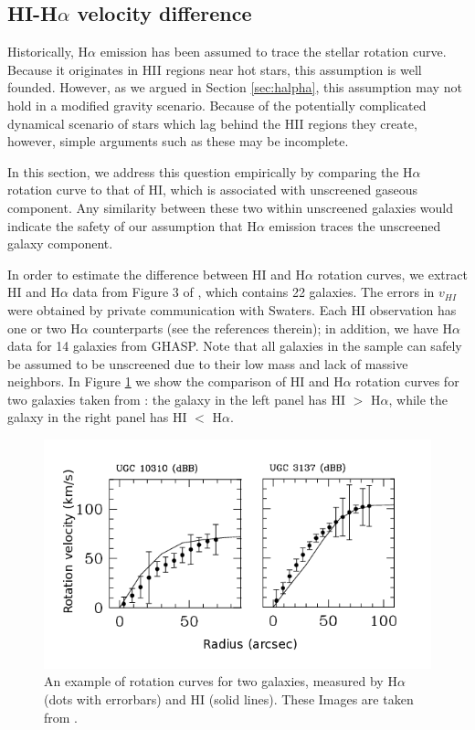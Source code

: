 \documentclass[useAMS,usenatbib,twocolumn]{mn2e}
\newcommand{\ha}{H$\alpha$}
\begin{document}
\subsection{HI-\ha{} velocity difference}
\label{sec:hihalpha}

Historically, \ha{} emission has been assumed to trace the stellar rotation
curve.  Because it originates in HII regions near hot stars, this assumption
is well founded.  However, as we argued in Section \ref{sec:halpha}, this
assumption may not hold in a modified gravity scenario.  Because of the
potentially complicated dynamical scenario of stars which lag behind the HII
regions they create, however, simple arguments such as these may be incomplete.

In this section, we address this question empirically
by comparing the \ha{} rotation curve to that of HI, which is
associated with unscreened gaseous component. Any similarity between
these two within unscreened galaxies would indicate the safety of our
assumption that \ha{} emission traces the unscreened galaxy component.

In order to estimate the difference between HI and \ha{} rotation
curves, we extract HI and \ha{} data from Figure 3 of \citet{Swaters2009}, which
contains 22 galaxies. The errors in $v_{HI}$ were obtained by private
communication with Swaters.  Each HI observation has one or two \ha{}
counterparts (see the references therein); in addition, we have \ha{} data for
14 galaxies from GHASP. Note that all galaxies in the sample can safely be
assumed to be unscreened due
to their low mass and lack of massive neighbors. In Figure \ref{h1-ha-rot-eg} we
show the comparison of HI and \ha{} rotation curves for two galaxies taken from
\citet{Swaters2009}: the galaxy in the left panel has HI $>$ \ha{}, while the
galaxy in the right panel has HI $<$ \ha{}.

\begin{figure}
\begin{center}
  \includegraphics[scale=0.4]{figures/H1-HA-rot-eg.png}
\caption{An example of rotation curves for two galaxies, measured by \ha{}
(dots with errorbars) and HI (solid lines).
These Images are taken from \citet{Swaters2009}.}
\label{h1-ha-rot-eg}
\end{center}
\end{figure}
\end{document}
